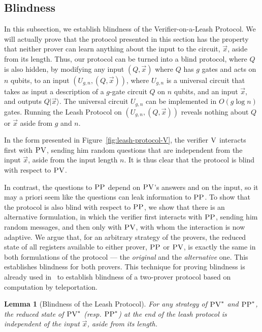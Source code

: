 \documentclass[11pt,letter]{article}
\newtheorem{lemma}[theorem]{Lemma}
\theoremstyle{remark}
\theoremstyle{definition}
\newcommand{\ket}[1]{|#1\rangle}
\newcommand{\ver}{\textsc{V}}
\newcommand{\pv}{\textsc{PV}}
\newcommand{\pp}{\textsc{PP}}
\begin{document}
\subsection{Blindness}
\label{sec:leash-blind}

In this subsection, we establish blindness of the Verifier-on-a-Leash Protocol. We will actually prove that the protocol presented in this section has the property that neither prover can learn anything about the input to the circuit, $\vec{x}$, aside from its length. Thus, our protocol can be turned into a blind protocol, where $Q$ is also hidden, by modifying any input $(Q,\vec{x})$ where $Q$ has $g$ gates and acts on $n$ qubits, to an input $(U_{g,n},(Q,\vec{x}))$, where $U_{g,n}$ is a universal circuit that takes as input a description of a $g$-gate circuit $Q$ on $n$ qubits, and an input $\vec{x}$, and outputs $Q\ket{\vec{x}}$. The universal circuit $U_{g,n}$ can be implemented in $O(g\log n)$ gates. Running the Leash Protocol on $(U_{g,n},(Q,\vec{x}))$ reveals nothing about $Q$ or $\vec{x}$ aside from $g$ and $n$.

In the form presented in Figure~\ref{fig:leash-protocol-V}, the verifier $\ver$ interacts first with $\pv$, sending him random questions that are independent from the input $\vec{x}$, aside from the input length $n$. It is thus clear that the protocol is blind with respect to $\pv$. 

In contrast, the questions to $\pp$ depend on $\pv$'s answers and on the input, so it may a priori seem like the questions can leak information to $\pp$. To show that the protocol is also blind with respect to $\pp$, we show that there is an alternative formulation, in which the verifier first interacts with $\pp$, sending him random messages, and then only with $\pv$, with whom the interaction is now adaptive. We argue that, for an arbitrary strategy of the provers, the reduced state of all registers available to either prover, $\pp$ or $\pv$, is exactly the same in both formulations of the protocol --- the \emph{original} and the \emph{alternative} one. This establishes blindness for both provers. This technique for proving blindness is already used in~\cite{reichardt2012classical} to establish blindness of a two-prover protocol based on computation by teleportation. 


\begin{lemma}[Blindness of the Leash Protocol]
For any strategy of $\pv^*$ and $\pp^*$, the reduced state of $\pv^*$ (resp. $\pp^*$) at the end of the leash protocol
is independent of the input $\vec{x}$, aside from its length.
\end{lemma}
\end{document}
